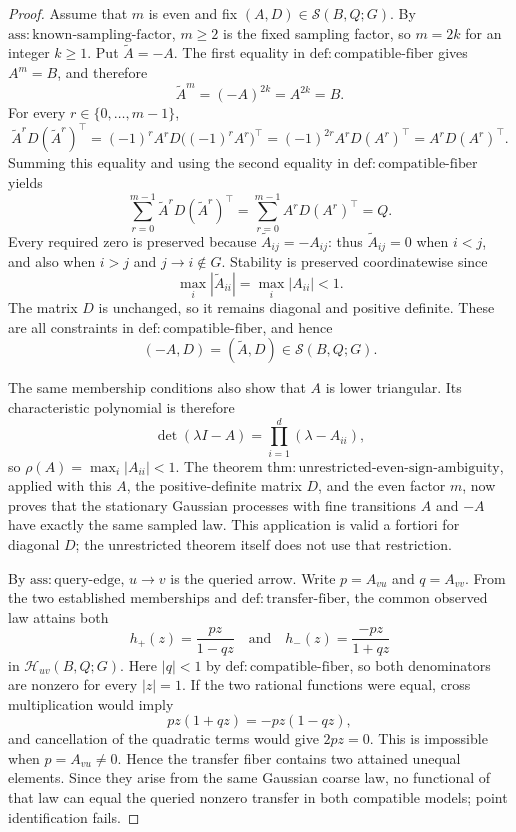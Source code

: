 \documentclass{article}
\begin{document}
\begin{proof}
Assume that \(m\) is even and fix \((A,D)\in\mathcal S(B,Q;G)\).  By \(\mathrm{ass{:}known\mbox{-}sampling\mbox{-}factor}\), \(m\ge2\) is the fixed sampling factor, so \(m=2k\) for an integer \(k\ge1\).  Put \(\widetilde A=-A\).  The first equality in \(\mathrm{def{:}compatible\mbox{-}fiber}\) gives \(A^m=B\), and therefore
\[
 \widetilde A^m=(-A)^{2k}=A^{2k}=B.
\]
For every \(r\in\{0,\ldots,m-1\}\),
\[
 \widetilde A^rD(\widetilde A^r)^\top
 =(-1)^rA^rD\bigl((-1)^rA^r\bigr)^\top
 =(-1)^{2r}A^rD(A^r)^\top
 =A^rD(A^r)^\top.
\]
Summing this equality and using the second equality in \(\mathrm{def{:}compatible\mbox{-}fiber}\) yields
\[
 \sum_{r=0}^{m-1}\widetilde A^rD(\widetilde A^r)^\top
 =\sum_{r=0}^{m-1}A^rD(A^r)^\top
 =Q.
\]
Every required zero is preserved because \(\widetilde A_{ij}=-A_{ij}\): thus \(\widetilde A_{ij}=0\) when \(i<j\), and also when \(i>j\) and \(j\to i\notin G\).  Stability is preserved coordinatewise since
\[
 \max_i|\widetilde A_{ii}|=\max_i|A_{ii}|<1.
\]
The matrix \(D\) is unchanged, so it remains diagonal and positive definite.  These are all constraints in \(\mathrm{def{:}compatible\mbox{-}fiber}\), and hence
\[
 (-A,D)=(\widetilde A,D)\in\mathcal S(B,Q;G).
\]

The same membership conditions also show that \(A\) is lower triangular.  Its characteristic polynomial is therefore
\[
 \det(\lambda I-A)=\prod_{i=1}^{d}(\lambda-A_{ii}),
\]
so \(\rho(A)=\max_i|A_{ii}|<1\).  The theorem \(\mathrm{thm{:}unrestricted\mbox{-}even\mbox{-}sign\mbox{-}ambiguity}\), applied with this \(A\), the positive-definite matrix \(D\), and the even factor \(m\), now proves that the stationary Gaussian processes with fine transitions \(A\) and \(-A\) have exactly the same sampled law.  This application is valid a fortiori for diagonal \(D\); the unrestricted theorem itself does not use that restriction.

By \(\mathrm{ass{:}query\mbox{-}edge}\), \(u\to v\) is the queried arrow.  Write \(p=A_{vu}\) and \(q=A_{vv}\).  From the two established memberships and \(\mathrm{def{:}transfer\mbox{-}fiber}\), the common observed law attains both
\[
 h_+(z)=\frac{pz}{1-qz}
 \quad\text{and}\quad
 h_-(z)=\frac{-pz}{1+qz}
\]
in \(\mathcal H_{uv}(B,Q;G)\).  Here \(|q|<1\) by \(\mathrm{def{:}compatible\mbox{-}fiber}\), so both denominators are nonzero for every \(|z|=1\).  If the two rational functions were equal, cross multiplication would imply
\[
 pz(1+qz)=-pz(1-qz),
\]
and cancellation of the quadratic terms would give \(2pz=0\).  This is impossible when \(p=A_{vu}\ne0\).  Hence the transfer fiber contains two attained unequal elements.  Since they arise from the same Gaussian coarse law, no functional of that law can equal the queried nonzero transfer in both compatible models; point identification fails.
\end{proof}
\end{document}
